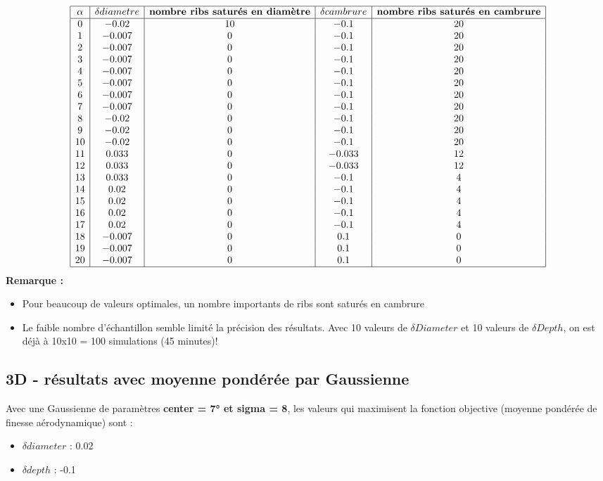 \documentclass[conference]{IEEEtran}
\begin{document}
\[
\begin{array}{|c|c|c|c|c|}
    \hline
    \textbf{$\alpha$} & \textbf{$\delta diametre$} & \textbf{nombre ribs saturés en diamètre} & \textbf{$\delta cambrure$} & \textbf{nombre ribs saturés en cambrure}\\
    \hline
    0 & -0.02 & 10 & -0.1 & 20\\
    1 & -0.007 & 0 & -0.1 & 20\\
    2 & -0.007 & 0 & -0.1 & 20\\
    3 & -0.007 & 0 & -0.1 & 20 \\
    4 & -0.007 & 0 & -0.1 & 20 \\
    5 & -0.007 & 0 & -0.1 & 20 \\
    6 & -0.007 & 0 & -0.1 & 20  \\
    7 & -0.007 & 0 & -0.1 & 20 \\
    8 & -0.02 & 0 & -0.1 & 20 \\
    9 & -0.02 & 0 & -0.1 & 20 \\
    10 & -0.02 & 0 & -0.1 & 20 \\
    11 & 0.033 & 0 & -0.033 & 12 \\
    12 & 0.033 & 0 & -0.033 & 12 \\
    13 & 0.033 & 0 & -0.1 & 4 \\
    14 & 0.02 & 0 & -0.1 & 4 \\
    15 & 0.02 & 0 & -0.1 & 4 \\
    16 & 0.02 & 0 & -0.1 & 4 \\
    17 & 0.02 & 0 & -0.1 & 4 \\
    18 & -0.007 & 0 & 0.1 & 0 \\
    19 & -0.007 & 0 & 0.1 & 0 \\
    20 & -0.007 & 0 & 0.1 & 0 \\
    \hline
\end{array}
\]
    \textbf{Remarque :}
    \begin{itemize}
        \item Pour beaucoup de valeurs optimales, un nombre importants de ribs sont saturés en cambrure
        \item Le faible nombre d'échantillon semble limité la précision des résultats. Avec 10 valeurs de $\delta Diameter$ et 10 valeurs de $\delta Depth$, on est déjà à 10x10 = 100 simulations (45 minutes)!
    \end{itemize}

\subsection{3D - résultats avec moyenne pondérée par Gaussienne}
Avec une Gaussienne de paramètres \textbf{center = 7° et sigma = 8}, les valeurs qui maximisent la fonction objective (moyenne pondérée de finesse aérodynamique) sont :
\begin{itemize}
    \item $\delta diameter$ : 0.02
    \item $\delta depth$ : -0.1
\end{itemize}
\end{document}
